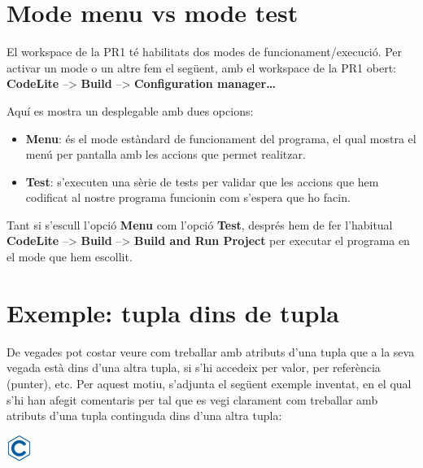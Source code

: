\documentclass[
]{book}
\providecommand{\tightlist}{%
  \setlength{\itemsep}{0pt}\setlength{\parskip}{0pt}}
\begin{document}
\hypertarget{mode-menu-vs-mode-test}{%
\section{Mode menu vs mode test}\label{mode-menu-vs-mode-test}}

El workspace de la PR1 té habilitats dos modes de funcionament/execució. Per activar un mode o un altre fem el següent, amb el workspace de la PR1 obert: \textbf{CodeLite} --\textgreater{} \textbf{Build} --\textgreater{} \textbf{Configuration manager\ldots{}}

Aquí es mostra un desplegable amb dues opcions:

\begin{itemize}
\tightlist
\item
  \textbf{Menu}: és el mode estàndard de funcionament del programa, el qual mostra el menú per pantalla amb les accions que permet realitzar.
\item
  \textbf{Test}: s'executen una sèrie de tests per validar que les accions que hem codificat al nostre programa funcionin com s'espera que ho facin.
\end{itemize}

Tant si s'escull l'opció \textbf{Menu} com l'opció \textbf{Test}, després hem de fer l'habitual \textbf{CodeLite} --\textgreater{} \textbf{Build} --\textgreater{} \textbf{Build and Run Project} per executar el programa en el mode que hem escollit.

\hypertarget{exemple-tupla-dins-de-tupla}{%
\section{Exemple: tupla dins de tupla}\label{exemple-tupla-dins-de-tupla}}

De vegades pot costar veure com treballar amb atributs d'una tupla que a la seva vegada està dins d'una altra tupla, si s'hi accedeix per valor, per referència (punter), etc. Per aquest motiu, s'adjunta el següent exemple inventat, en el qual s'hi han afegit comentaris per tal que es vegi clarament com treballar amb atributs d'una tupla continguda dins d'una altra tupla:

\includegraphics{./img/c.png}
\end{document}
